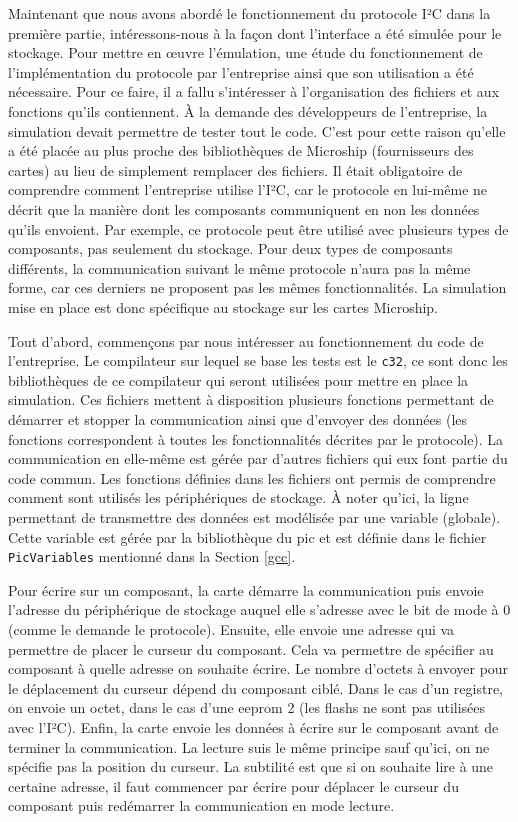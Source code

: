 \documentclass[a4paper]{article}
\begin{document}
Maintenant que nous avons abordé le fonctionnement du protocole I²C dans la
première partie, intéressons-nous à la façon dont l'interface a été simulée pour
le stockage. Pour mettre en œuvre l'émulation, une étude du fonctionnement de
l'implémentation du protocole par l'entreprise ainsi que son utilisation a été
nécessaire. Pour ce faire, il a fallu s'intéresser à l'organisation des fichiers
et aux fonctions qu'ils contiennent. À la demande des développeurs de
l'entreprise, la simulation devait permettre de tester tout le code. C'est pour
cette raison qu'elle a été placée au plus proche des bibliothèques de Microship
(fournisseurs des cartes) au lieu de simplement remplacer des fichiers. Il était
obligatoire de comprendre comment l'entreprise utilise l'I²C, car le protocole
en lui-même ne décrit que la manière dont les composants communiquent en non les
données qu'ils envoient. Par exemple, ce protocole peut être utilisé avec
plusieurs types de composants, pas seulement du stockage. Pour deux types de
composants différents, la communication suivant le même protocole n'aura pas la
même forme, car ces derniers ne proposent pas les mêmes fonctionnalités. La
simulation mise en place est donc spécifique au stockage sur les cartes
Microship.

Tout d'abord, commençons par nous intéresser au fonctionnement du code de
l'entreprise. Le compilateur sur lequel se base les tests est le \verb|c32|, ce
sont donc les bibliothèques de ce compilateur qui seront utilisées pour mettre
en place la simulation. Ces fichiers mettent à disposition plusieurs fonctions
permettant de démarrer et stopper la communication ainsi que d'envoyer des
données (les fonctions correspondent à toutes les fonctionnalités décrites par
le protocole). La communication en elle-même est gérée par d'autres fichiers qui
eux font partie du code commun. Les fonctions définies dans les fichiers ont
permis de comprendre comment sont utilisés les périphériques de stockage. À
noter qu'ici, la ligne permettant de transmettre des données est modélisée par
une variable (globale). Cette variable est gérée par la bibliothèque du
\gls{pic} et est définie dans le fichier \verb|PicVariables| mentionné dans la
Section \ref{gcc}.

Pour écrire sur un composant, la carte démarre la communication puis envoie
l'adresse du périphérique de stockage auquel elle s'adresse avec le bit de mode
à
0 (comme le demande le protocole). Ensuite, elle envoie une adresse qui va
permettre de placer le curseur du composant. Cela va permettre de spécifier au
composant à quelle adresse on souhaite écrire. Le nombre d'octets à envoyer pour
le déplacement du curseur dépend du composant ciblé. Dans le cas d'un registre,
on envoie un octet, dans le cas d'une eeprom 2 (les flashs ne sont pas utilisées
avec l'I²C). Enfin, la carte envoie les données à écrire sur le composant avant
de terminer la communication. La lecture suis le même principe sauf qu'ici, on
ne spécifie pas la position du curseur. La subtilité est que si on souhaite lire
à une certaine adresse, il faut commencer par écrire pour déplacer le curseur du
composant puis redémarrer la communication en mode lecture.
\end{document}
